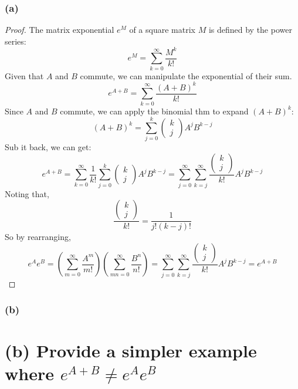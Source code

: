 \documentclass{article}
\begin{document}
\subsubsection*{(a)}
\begin{proof}
    The matrix exponential $e^M$ of a square matrix $M$ is defined by the power series:
    \[ e^M = \sum_{k = 0}^{\infty} \frac{M^k}{k!} \]
    Given that $A$ and $B$ commute, we can manipulate the exponential of their sum.
    \[ e^{A + B} = \sum_{k = 0}^{\infty} \frac{(A + B)^k}{k!} \]
    Since $A$ and $B$ commute, we can apply the binomial thm to expand $(A + B)^k$:
    \[ (A + B)^k = \sum_{j = 0}^{k} \begin{pmatrix} k \\ j \end{pmatrix} A^j B^{k - j} \]
    Sub it back, we can get:
    \[ e^{A + B} = \sum_{k = 0}^{\infty} \frac{1}{k!} \sum_{j = 0}^{k} \begin{pmatrix} k \\ j \end{pmatrix} A^j B^{k - j} = \sum_{j = 0}^{\infty} \sum_{k = j}^{\infty} \frac{\begin{pmatrix} k \\ j \end{pmatrix}}{k!} A^j B^{k - j} \]
    Noting that,
    \[ \frac{\begin{pmatrix} k \\ j \end{pmatrix}}{k!} = \frac{1}{j!(k - j)!} \]
    So by rearranging,
    \[ e^{A} e^{B} = \left( \sum_{m = 0}^{\infty} \frac{A^m}{m!} \right) \left( \sum_{mn= 0}^{\infty} \frac{B^n}{n!} \right) = \sum_{j = 0}^{\infty} \sum_{k = j}^{\infty} \frac{\begin{pmatrix} k \\ j \end{pmatrix}}{k!} A^j B^{k - j} = e^{A + B} \]
\end{proof}

\subsubsection*{(b)}
\section*{(b) Provide a simpler example where \( e^{A+B} \neq e^{A} e^{B} \)}
\end{document}
